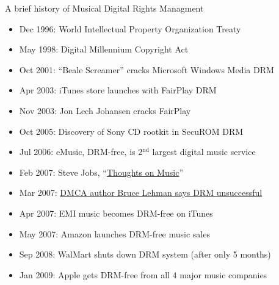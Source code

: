 \documentclass{beamer}
\begin{document}
\begin{frame}{A brief history of Musical Digital Rights Managment}
\begin{itemize}
\item Dec 1996: World Intellectual Property Organization Treaty
\item May 1998: Digital Millennium Copyright Act
\item Oct 2001: ``Beale Screamer'' cracks Microsoft Windows Media DRM
\item Apr 2003: iTunes store launches with FairPlay DRM
\item Nov 2003: Jon Lech Johansen cracks FairPlay
\item Oct 2005: Discovery of Sony CD rootkit in SecuROM DRM
\item Jul 2006: eMusic, DRM-free, is 2$^{\text{nd}}$ largest digital music service
\item Feb 2007: Steve Jobs, ``\href{http://www.apple.com/ca/hotnews/thoughtsonmusic/}{Thoughts on Music}''
\item Mar 2007: \href{http://www.michaelgeist.ca/content/view/1826/125/}{DMCA author Bruce Lehman says DRM unsuccessful}
\item Apr 2007: EMI music becomes DRM-free on iTunes
\item May 2007: Amazon launches DRM-free music sales
\item Sep 2008: WalMart shuts down DRM system (after only 5 months)
\item Jan 2009: Apple gets DRM-free from all 4 major music companies
\end{itemize}
\end{frame}
\end{document}
